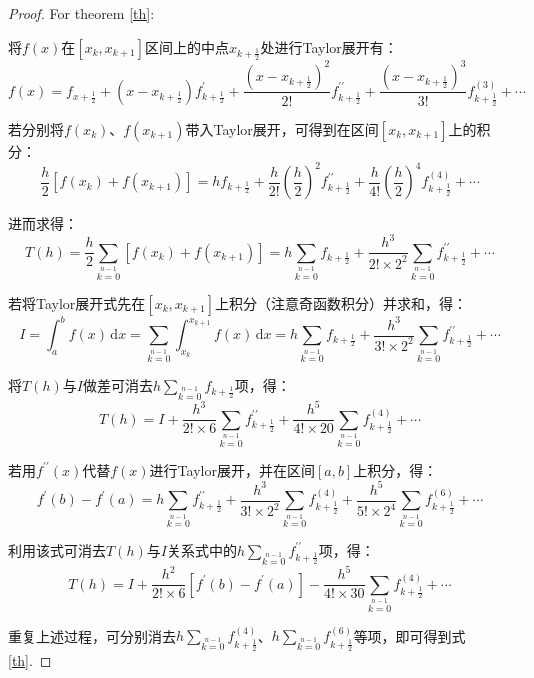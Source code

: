 \begin{proof}
For theorem \ref{th}: 

将$f(x)$在$[x_k,x_{k+1}]$区间上的中点$x_{k+\frac{1}{2}}$处进行Taylor展开有：
$$
    f(x) = f_{x+\frac{1}{2}} + (x-x_{k+\frac{1}{2}})f_{k+\frac{1}{2}}^{\prime} + \frac{(x-x_{k+\frac{1}{2}})^2}{2!}f_{k+\frac{1}{2}}^{\prime \prime} + \frac{(x-x_{k+\frac{1}{2}})^3}{3!}f^{(3)}_{k+\frac{1}{2}} + \cdots
$$

若分别将$f(x_k)$、$f(x_{k+1})$带入Taylor展开，可得到在区间$[x_k,x_{k+1}]$上的积分：
$$
    \frac{h}{2}[f(x_k)+f(x_{k+1})] = hf_{k+\frac{1}{2}} + \frac{h}{2!} (\frac{h}{2})^2 f_{k+\frac{1}{2}}^{\prime \prime} + \frac{h}{4!}(\frac{h}{2})^4 f^{(4)}_{k+\frac{1}{2}} + \cdots
$$

进而求得：
$$
    T(h) = \frac{h}{2}\sum\limits_{k=0}\limits^{n-1}[f(x_k)+f(x_{k+1}) ] = h\sum\limits_{k=0}\limits^{n-1}f_{k+\frac{1}{2}} + \frac{h^3}{2!\times 2^2}\sum\limits_{k=0}\limits^{n-1}f_{k+\frac{1}{2}}^{\prime \prime}+\cdots
$$

若将Taylor展开式先在$[x_k,x_{k+1}]$上积分（注意奇函数积分）并求和，得：
$$
    I=\int_a^bf(x)\,\mathrm{d}x = \sum\limits_{k=0}\limits^{n-1}\int_{x_k}^{x_{k+1}}f(x)\,\mathrm{d}x = h\sum\limits_{k=0}\limits^{n-1}f_{k+\frac{1}{2}} + \frac{h^3}{3!\times 2^2}\sum\limits_{k=0}\limits^{n-1}f_{k+\frac{1}{2}}^{\prime \prime}+\cdots
$$

将$T(h)$与$I$做差可消去$h\sum\limits_{k=0}\limits^{n-1}f_{k+\frac{1}{2}}$项，得：
$$
    T(h) = I + \frac{h^3}{2!\times6}\sum\limits_{k=0}\limits^{n-1}f_{k+\frac{1}{2}}^{\prime \prime} + \frac{h^5}{4!\times 20}\sum\limits_{k=0}\limits^{n-1}f_{k+\frac{1}{2}}^{(4)} + \cdots
$$

若用$f^{\prime \prime}(x)$代替$f(x)$进行Taylor展开，并在区间$[a,b]$上积分，得：
$$
    f^{\prime}(b) - f^{\prime}(a) = h\sum\limits_{k=0}\limits^{n-1}f_{k+\frac{1}{2}}^{\prime \prime} + \frac{h^3}{3!\times 2^2}\sum\limits_{k=0}\limits^{n-1}f_{k+\frac{1}{2}}^{(4)}+ \frac{h^5}{5!\times 2^4}\sum\limits_{k=0}\limits^{n-1}f_{k+\frac{1}{2}}^{(6)} + \cdots
$$

利用该式可消去$T(h)$与$I$关系式中的$h\sum\limits_{k=0}\limits^{n-1}f_{k+\frac{1}{2}}^{\prime \prime}$项，得：
$$
T(h) = I + \frac{h^2}{2!\times6}[f^{\prime}(b) - f^{\prime}(a)] - \frac{h^5}{4!\times 30}\sum\limits_{k=0}\limits^{n-1}f_{k+\frac{1}{2}}^{(4)} +\cdots
$$

重复上述过程，可分别消去$h\sum\limits_{k=0}\limits^{n-1}f_{k+\frac{1}{2}}^{(4)}$、$h\sum\limits_{k=0}\limits^{n-1}f_{k+\frac{1}{2}}^{(6)}$等项，即可得到式 \ref{th}.
\end{proof}


